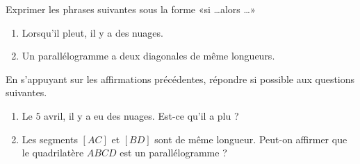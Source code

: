 
\begin{exercice}\label{exosmath-0782}

    Exprimer les phrases suivantes sous la forme «si \ldots alors \ldots» 
    \begin{enumerate}
        \item
            Lorsqu'il pleut, il y a des nuages.
        \item
            Un parallélogramme a deux diagonales de même longueurs.
    \end{enumerate}
    En s'appuyant sur les affirmations précédentes, répondre si possible aux questions suivantes.
    \begin{enumerate}
        \item
            Le \( 5\) avril, il y a eu des nuages. Est-ce qu'il a plu ?
        \item
            Les segments \( [AC]\) et \( [BD]\) sont de même longueur. Peut-on affirmer que le quadrilatère \( ABCD\) est un parallélogramme ?
    \end{enumerate}

\end{exercice}

